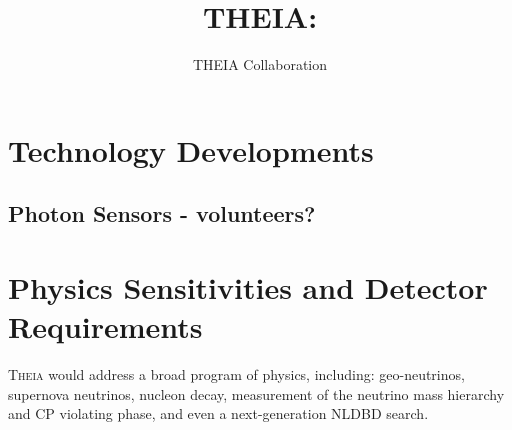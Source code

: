 \documentclass[11pt,prd,letterpaper,amsmath,amssymb,final,nofootinbib
,unsortedaddress,superscriptaddress
]{revtex4-1}
\begin{document}
\title{ THEIA: \\ {\small }}

\author{THEIA Collaboration}

\maketitle



\section{Technology Developments}

\subsection{Photon Sensors - \bf volunteers?}



\section{Physics Sensitivities and Detector Requirements}\label{s:physics}

\textsc{Theia} would address a broad program of physics, including: geo-neutrinos, supernova neutrinos, 
nucleon decay, measurement of the neutrino mass hierarchy and CP violating phase, 
and even a next-generation NLDBD search.   








\end{document}
